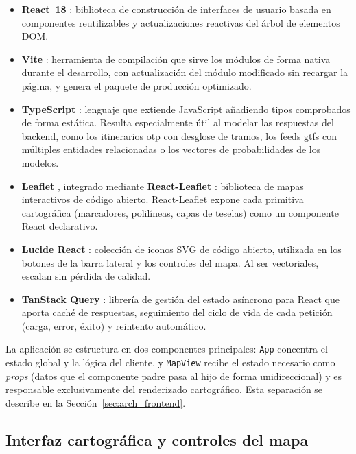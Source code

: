 \begin{itemize}
  \item \textbf{React~18} \cite{ReactDocs}: biblioteca de construcción de interfaces de usuario basada en componentes reutilizables y actualizaciones reactivas del árbol de elementos DOM.
  \item \textbf{Vite} \cite{ViteDocs}: herramienta de compilación que sirve los módulos de forma nativa durante el desarrollo, con actualización del módulo modificado sin recargar la página, y genera el paquete de producción optimizado.
  \item \textbf{TypeScript} \cite{TypeScriptDocs}: lenguaje que extiende JavaScript añadiendo tipos comprobados de forma estática. Resulta especialmente útil al modelar las respuestas del backend, como los itinerarios \gls{otp} con desglose de tramos, los feeds \gls{gtfs} con múltiples entidades relacionadas o los vectores de probabilidades de los modelos.
  \item \textbf{Leaflet} \cite{LeafletDocs}, integrado mediante \textbf{React-Leaflet} \cite{ReactLeafletDocs}: biblioteca de mapas interactivos de código abierto. React-Leaflet expone cada primitiva cartográfica (marcadores, polilíneas, capas de teselas) como un componente React declarativo.
  \item \textbf{Lucide React} \cite{LucideReact}: colección de iconos SVG de código abierto, utilizada en los botones de la barra lateral y los controles del mapa. Al ser vectoriales, escalan sin pérdida de calidad.
  \item \textbf{TanStack Query} \cite{TanStackQuery}: librería de gestión del estado asíncrono para React que aporta caché de respuestas, seguimiento del ciclo de vida de cada petición (carga, error, éxito) y reintento automático.
\end{itemize}

La aplicación se estructura en dos componentes principales: \texttt{App} concentra el estado global y la lógica del cliente, y \texttt{MapView} recibe el estado necesario como \textit{props} (datos que el componente padre pasa al hijo de forma unidireccional) y es responsable exclusivamente del renderizado cartográfico. Esta separación se describe en la Sección~\ref{sec:arch_frontend}.
\newpage

\subsection{Interfaz cartográfica y controles del mapa}
\label{subsec:impl_frontend_mapa}

